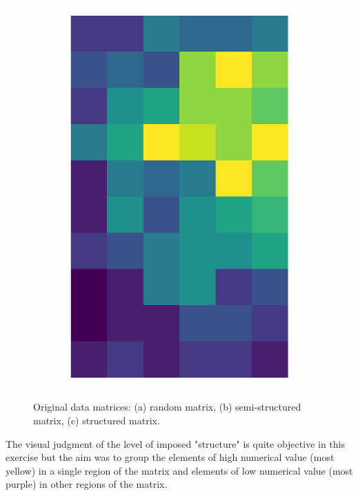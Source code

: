 \documentclass[10pt,twocolumn]{article}
\begin{document}
\begin{figure}[H]
\begin{subfigure}[t]{.15\textwidth}
\caption{ }
\end{subfigure}
\begin{subfigure}[t]{.15\textwidth}
\centering
\includegraphics[scale=.2]{structured-matrix-original.png}
\caption{ }
\end{subfigure}
\caption{Original data matrices: (a) random matrix, (b) semi-structured matrix, (c) structured matrix.}
\label{fig:matrices}
\end{figure}

The visual judgment of the level of imposed "structure" is quite objective in this exercise but the aim was to group the elements of high numerical value (most yellow) in a single region of the matrix and elements of low numerical value (most purple) in other regions of the matrix.
\end{document}
